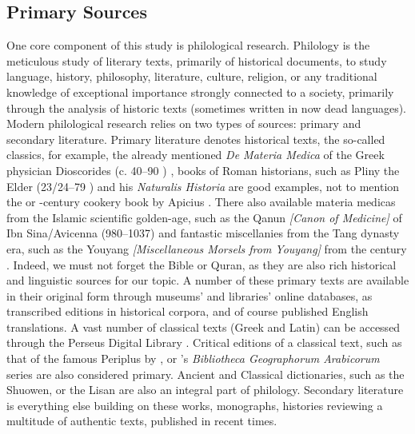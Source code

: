 \subsection{Primary Sources}

One core component of this study is philological research. Philology is the meticulous study of literary texts, primarily of historical documents, to study language, history, philosophy, literature, culture, religion, or any traditional knowledge of exceptional importance strongly connected to a society, primarily through the analysis of historic texts (sometimes written in now dead languages). Modern philological research relies on two types of sources: primary and secondary literature. Primary literature denotes historical texts, the so-called classics, for example, the already mentioned \textit{De Materia Medica} of the Greek physician Dioscorides (c. 40--90 \AD) \autocite{dioscorides_materia_2005}, books of Roman historians, such as Pliny the Elder (23/24--79 \AD) and his \textit{Naturalis Historia} \autocite{pliny_the_elder_natural_1855} are good examples, not to mention the or -century cookery book by Apicius \autocite{apicius_apicius_1977}. There also available \glspl{materia medica} from the Islamic scientific golden-age, such as the \gls{Qanun} \textit{[Canon of Medicine]} of Ibn Sina/Avicenna (980--1037) \autocite{ibn_sina_-qanun_1329} and fantastic miscellanies from the Tang dynasty era, such as the \gls{Youyang} \textit{[Miscellaneous Morsels from Youyang]} from the  century \autocite{yyzz}. Indeed, we must not forget the Bible or Quran, as they are also rich historical and linguistic sources for our topic. A number of these primary texts are available in their original form through museums' and libraries' online databases, as transcribed editions in historical corpora, and of course published English translations. A vast number of classical texts (Greek and Latin) can be accessed through the Perseus Digital Library \autocite{crane_perseus_nodate}. Critical editions of a classical text, such as that of the famous \gls{Periplus} by \textcite{casson_periplus_1989}, or \textcite{de_goeje_bibliotheca_1870}'s \textit{Bibliotheca Geographorum Arabicorum} series are also considered primary. Ancient and Classical dictionaries, such as the \gls{Shuowen}, or the \gls{Lisan} are also an integral part of philology. Secondary literature is everything else building on these works, monographs, histories reviewing a multitude of authentic texts, published in recent times.




